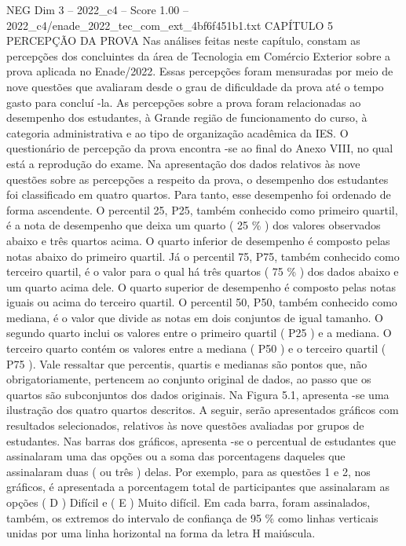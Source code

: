 \begin{textsample}{NEG Dim 3 – 2022\_c4 – Score 1.00 – 2022\_c4/enade\_2022\_tec\_com\_ext\_4bf6f451b1.txt}  \label{ex:f3_neg_153}
CAPÍTULO 5 PERCEPÇÃO DA PROVA Nas análises feitas neste capítulo, constam as percepções dos concluintes da área de Tecnologia em Comércio Exterior sobre a prova aplicada no Enade/2022.
Essas percepções foram mensuradas por meio de nove questões que avaliaram desde o grau de dificuldade da prova até o tempo gasto para concluí -la.
As percepções sobre a prova foram relacionadas ao desempenho dos estudantes, à Grande região de funcionamento do curso, à categoria administrativa e ao tipo de organização acadêmica da IES.
O questionário de percepção da prova encontra -se ao final do Anexo VIII, no qual está a reprodução do exame.
Na apresentação dos dados relativos às nove questões sobre as percepções a respeito da prova, o desempenho dos estudantes foi classificado em quatro quartos.
Para tanto, esse desempenho foi ordenado de forma ascendente.
O percentil 25, P25, também conhecido como primeiro quartil, é a nota de desempenho que deixa um quarto ( 25 \% ) dos valores observados abaixo e três quartos acima.
O quarto inferior de desempenho é composto pelas notas abaixo do primeiro quartil.
Já o percentil 75, P75, também conhecido como terceiro quartil, é o valor para o qual há três quartos ( 75 \% ) dos dados abaixo e um quarto acima dele.
O quarto superior de desempenho é composto pelas notas iguais ou acima do terceiro quartil.
O percentil 50, P50, também conhecido como mediana, é o valor que divide as notas em dois conjuntos de igual tamanho.
O segundo quarto inclui os valores entre o primeiro quartil ( P25 ) e a mediana.
O terceiro quarto contém os valores entre a mediana ( P50 ) e o terceiro quartil ( P75 ).
Vale ressaltar que percentis, quartis e medianas são pontos que, não obrigatoriamente, pertencem ao conjunto original de dados, ao passo que os quartos são subconjuntos dos dados originais.
Na Figura 5.1, apresenta -se uma ilustração dos quatro quartos descritos.
A seguir, serão apresentados gráficos com resultados selecionados, relativos às nove questões avaliadas por grupos de estudantes.
Nas barras dos gráficos, apresenta -se o percentual de estudantes que assinalaram uma das opções ou a soma das porcentagens daqueles que assinalaram duas ( ou três ) delas.
Por exemplo, para as questões 1 e 2, nos gráficos, é apresentada a porcentagem total de participantes que assinalaram as opções ( D ) Difícil e ( E ) Muito difícil.
Em cada barra, foram assinalados, também, os extremos do intervalo de confiança de 95 \% como linhas verticais unidas por uma linha horizontal na forma da letra H maiúscula.

\end{textsample}
